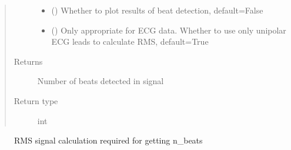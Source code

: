 \documentclass[letterpaper,10pt,english]{sphinxmanual}
\begin{document}
\begin{fulllineitems}
\begin{fulllineitems}
\begin{quote}
\begin{description}
\begin{itemize}
\item {} 
\sphinxAtStartPar
{} () \textendash{} Whether to plot results of beat detection, default=False

\item {} 
\sphinxAtStartPar
{} (\sphinxstyleliteralemphasis{\sphinxupquote{, }}) \textendash{} Only appropriate for ECG data. Whether to use only unipolar ECG leads to calculate RMS, default=True

\end{itemize}

\item[{Returns}] \leavevmode
\sphinxAtStartPar
{} \textendash{} Number of beats detected in signal

\item[{Return type}] \leavevmode
\sphinxAtStartPar
int

\end{description}\end{quote}


\nopagebreak

\begin{description}
\item[{{\hyperref[\detokenize{_autosummary/signalanalysis.general.Signal:id1}]{}}}] \leavevmode
\sphinxAtStartPar
RMS signal calculation required for getting n\_beats

\end{description}



\end{fulllineitems}



\end{fulllineitems}
\end{document}
